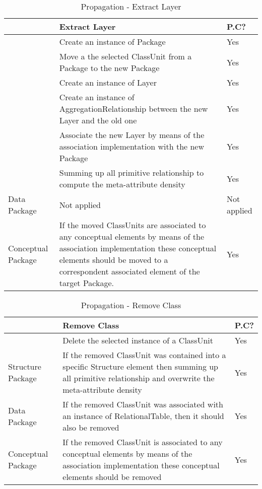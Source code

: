 \begin{table}
\caption{Propagation - Extract Layer}
{\footnotesize{}}%
\setlength{\tabcolsep}{0.0em}
{\renewcommand{\arraystretch}{0.5}
\begin{tabular}{|>{\centering}p{2cm}|>{\raggedright}p{5cm}|>{\centering}p{}|}
\hline 
{\footnotesize{Refactoring}} & {\footnotesize{Extract Layer}} & {\footnotesize{P.C?}}\tabularnewline
\hline 
\hline 
\multirow{2}{2cm}{{\footnotesize{Code Package}}} & {\footnotesize{Create an instance of Package}} & {\footnotesize{Yes}}\tabularnewline
\cline{2-3} 
 & {\footnotesize{Move a the selected ClassUnit from a Package to the
new Package}} & {\footnotesize{Yes}}\tabularnewline
\hline 
\multirow{4}{2cm}{{\footnotesize{Structure Package}}} & {\footnotesize{Create an instance of Layer }} & {\footnotesize{Yes}}\tabularnewline
\cline{2-3} 
 & {\footnotesize{Create an instance of AggregationRelationship between
the new Layer and the old one}} & {\footnotesize{Yes}}\tabularnewline
\cline{2-3} 
 & {\footnotesize{Associate the new Layer by means of the association
implementation with the new Package}} & {\footnotesize{Yes}}\tabularnewline
\cline{2-3} 
 & {\footnotesize{Summing up all primitive relationship to compute the
meta-attribute density}} & {\footnotesize{Yes}}\tabularnewline
\hline 
{\footnotesize{Data Package}} & {\footnotesize{Not applied}} & {\footnotesize{Not applied}}\tabularnewline
\hline 
{\footnotesize{Conceptual Package}} & {\footnotesize{If the moved ClassUnits are associated to any conceptual
elements by means of the association implementation these conceptual
elements should be moved to a correspondent associated element of
the target Package. }} & {\footnotesize{Yes}}\tabularnewline
\hline 
\end{tabular}}
\end{table}
\begin{table}
\caption{Propagation - Remove Class}
\label{tab:propagationRemoveClass}
{\footnotesize{}}%
\setlength{\tabcolsep}{0.0em}
{\renewcommand{\arraystretch}{0.5}
\begin{tabular}{|>{\centering}p{2cm}|>{\raggedright}p{5cm}|>{\centering}p{}|}
\hline 
{\footnotesize{Refactoring}} & {\footnotesize{Remove Class}} & {\footnotesize{P.C?}}\tabularnewline
\hline 
\hline 
{\footnotesize{Code Package}} & {\footnotesize{Delete the selected instance of a ClassUnit}} & {\footnotesize{Yes}}\tabularnewline
\hline 
{\footnotesize{Structure Package}} & {\footnotesize{If the removed ClassUnit was contained into a specific
Structure element then summing up all primitive relationship and overwrite
the meta-attribute density}} & {\footnotesize{Yes}}\tabularnewline
\hline 
{\footnotesize{Data Package}} & {\footnotesize{If the removed ClassUnit was associated with an instance
of RelationalTable, then it should also be removed}} & {\footnotesize{Yes}}\tabularnewline
\hline 
{\footnotesize{Conceptual Package}} & {\footnotesize{If the removed ClassUnit is associated to any conceptual
elements by means of the association implementation these conceptual
elements should be removed }} & {\footnotesize{Yes}}\tabularnewline
\hline 
\end{tabular}}
\end{table}


